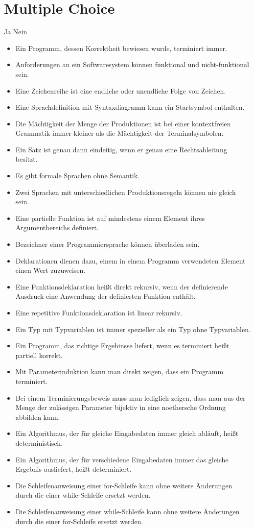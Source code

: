 \documentclass[11pt,a4paper,oneside,ngerman]{scrbook}
\begin{document}
\section{Multiple Choice}
Ja Nein
\begin{itemize}[label={\Square \ \Square}]
  \item Ein Programm, dessen Korrektheit bewiesen wurde, terminiert immer. %
  \item Anforderungen an ein Softwaresystem können funktional und nicht-funktional sein. %
  \item Eine Zeichenreihe ist eine endliche oder unendliche Folge von Zeichen. %
  \item Eine Sprachdefinition mit Syntaxdiagramm kann ein Startsymbol enthalten. %
  \item Die Mächtigkeit der Menge der Produktionen ist bei einer kontextfreien Grammatik immer kleiner als die Mächtigkeit der Terminalsymbolen. %
  \item Ein Satz ist genau dann eindeitig, wenn er genau eine Rechtsableitung besitzt. %
  \item Es gibt formale Sprachen ohne Semantik. %
  \item Zwei Sprachen mit unterschiedlichen Produktionsregeln können nie gleich sein. %
  \item Eine partielle Funktion ist auf mindestens einem Element ihres Argumentbereichs definiert. %
  \item Bezeichner einer Programmiersprache können überladen sein. %
  \item Deklarationen dienen dazu, einem in einem Programm verwendeten Element einen Wert zuzuweisen. %
  \item Eine Funktionsdeklaration heißt direkt rekursiv, wenn der definierende Ausdruck eine Anwendung der definierten Funktion enthält. %
  \item Eine repetitive Funktionsdeklaration ist linear rekursiv. %
  \item Ein Typ mit Typvariablen ist immer spezieller als ein Typ ohne Typvariablen. %
  \item Ein Programm, das richtige Ergebinsse liefert, wenn es terminiert heißt partiell korrekt. %
  \item Mit Parameterinduktion kann man direkt zeigen, dass ein Programm terminiert. %
  \item Bei einem Terminierungsbeweis muss man lediglich zeigen, dass man aus der Menge der zulässigen Parameter bijektiv in eine noethersche Ordnung abbilden kann. %
  \item Ein Algorithmus, der für gleiche Eingabedaten immer gleich abläuft, heißt deterministisch. %
  \item Ein Algorithmus, der für verschiedene Eingabedaten immer das gleiche Ergebnis ausliefert, heißt determiniert. %
  \item Die Schleifenanweisung einer for-Schleife kann ohne weitere Änderungen durch die einer while-Schleife ersetzt werden. %
  \item Die Schleifenanweisung einer while-Schleife kann ohne weitere Änderungen durch die einer for-Schleife ersetzt werden. %



\end{itemize}
\end{document}
